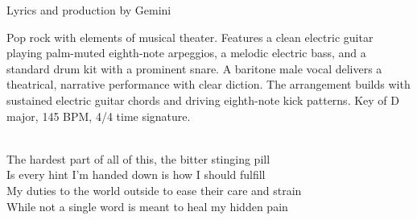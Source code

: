 
\label{sec:the-bitter-toll}

\begin{notes}
Lyrics and production by Gemini
\end{notes}

\begin{style}
Pop rock with elements of musical theater. %
Features a clean electric guitar playing palm-muted eighth-note arpeggios, a melodic electric bass, and a standard drum kit with a prominent snare. %
A baritone male vocal delivers a theatrical, narrative performance with clear diction. %
The arrangement builds with sustained electric guitar chords and driving eighth-note kick patterns. %
Key of D major, 145 BPM, 4/4 time signature.
\end{style}

\begin{lyrics}


\\
The hardest part of all of this, the bitter stinging pill \\
Is every hint I'm handed down is how I should fulfill\\
My duties to the world outside to ease their care and strain \\
While not a single word is meant to heal my hidden pain

\end{lyrics}

